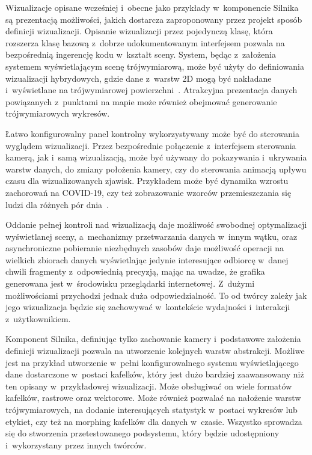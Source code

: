 Wizualizacje opisane wcześniej i~obecne jako przykłady w~komponencie Silnika są prezentacją możliwości, jakich dostarcza zaproponowany przez projekt sposób definicji wizualizacji. Opisanie wizualizacji przez pojedynczą klasę, która rozszerza klasę bazową z~dobrze udokumentowanym interfejsem pozwala na bezpośrednią ingerencję kodu w~kształt sceny. System, będąc z~założenia systemem wyświetlającym scenę trójwymiarową, może być użyty do definiowania wizualizacji hybrydowych, gdzie dane z~warstw 2D mogą być nakładane i~wyświetlane na trójwymiarowej powierzchni~\cite{Hybrid}. Atrakcyjna prezentacja danych powiązanych z~punktami na mapie może również obejmować generowanie trójwymiarowych wykresów.

Łatwo konfigurowalny panel kontrolny wykorzystywany może być do sterowania wyglądem wizualizacji. Przez bezpośrednie połączenie z~interfejsem sterowania kamerą, jak i~samą wizualizacją, może być używany do pokazywania i~ukrywania warstw danych, do zmiany położenia kamery, czy do sterowania animacją upływu czasu dla wizualizowanych zjawisk. Przykładem może być dynamika wzrostu zachorowań na COVID-19, czy też zobrazowanie wzorców przemieszczania się ludzi dla różnych pór dnia~\cite{Kwan}.

Oddanie pełnej kontroli nad wizualizacją daje możliwość swobodnej optymalizacji wyświetlanej sceny, a~mechanizmy przetwarzania danych w~innym wątku, oraz asynchroniczne pobieranie niezbędnych zasobów daje możliwość operacji na wielkich zbiorach danych wyświetlając jedynie interesujące odbiorcę w~danej chwili fragmenty z~odpowiednią precyzją, mając na uwadze, że grafika generowana jest w~środowisku przeglądarki internetowej. Z~dużymi możliwościami przychodzi jednak duża odpowiedzialność. To od twórcy zależy jak jego wizualizacja będzie się zachowywać w~kontekście wydajności i~interakcji z~użytkownikiem.

Komponent Silnika, definiując tylko zachowanie kamery i~podstawowe założenia definicji wizualizacji pozwala na utworzenie kolejnych warstw abstrakcji. Możliwe jest na przykład utworzenie w~pełni konfigurowalnego systemu wyświetlającego dane dostarczone w~postaci kafelków, który jest dużo bardziej zaawansowany niż ten opisany w~przykładowej wizualizacji. Może obsługiwać on wiele formatów kafelków, rastrowe oraz wektorowe. Może również pozwalać na nałożenie warstw trójwymiarowych, na dodanie interesujących statystyk w~postaci wykresów lub etykiet, czy też na morphing kafelków dla danych w~czasie. Wszystko sprowadza się do stworzenia przetestowanego podsystemu, który będzie udostępniony i~wykorzystany przez innych twórców. 